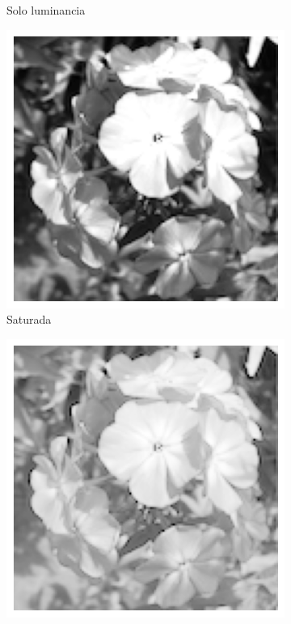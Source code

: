 \documentclass{article}
\begin{document}
\begin{figure}
\begin{subfigure}[b]{0.24\textwidth}
		\caption{Solo luminancia}
		\label{fg:imgGrau}
	\end{subfigure}
	\begin{subfigure}[b]{0.24\textwidth}
		\includegraphics[width= \textwidth]{saturada}
		\caption{Saturada}
		\label{fg:saturada}
	\end{subfigure}
	\begin{subfigure}[b]{0.24\textwidth}
		\includegraphics[width= \textwidth]{imgGrau0p4exp}

\end{subfigure}
\end{figure}
\end{document}
